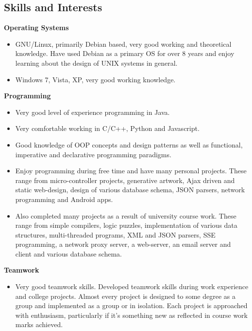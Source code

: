 \documentclass{res}
\begin{document}
\begin{resume}
 


     
\section{Skills and Interests} 
\renewcommand{\labelitemi}{$\bullet$}
\vspace{0.1in}
 {\bf Operating Systems}
    \begin{itemize} %
      \item GNU/Linux, primarily Debian based, very good working and theoretical knowledge. Have used Debian as a primary OS for over 8 years and enjoy learning about the design of UNIX systems in general.
      \item Windows 7, Vista, XP, very good working knowledge.
      \end{itemize}
{\bf Programming} 
       \begin{itemize}
        \item Very good level of experience programming in Java. 
        \item Very comfortable working in C/C++, Python and Javascript. 
        \item Good knowledge of OOP concepts and design patterns as well as functional, imperative and declarative programming paradigms. 
        \item Enjoy programming during free time and have many personal projects. These range from micro-controller projects, generative artwork, Ajax driven and static web-design, design of various database schema, JSON parsers, network programming and Android apps.
        \item Also completed many projects as a result of university course work. These range from simple compilers, logic puzzles, implementation of various data structures, multi-threaded programs, XML and JSON parsers, SSE programming, a network proxy server, a web-server, an email server and client and various database schema.
    \end{itemize}

    {\bf  Teamwork} 
        \begin{itemize}
        \item  Very good teamwork skills. Developed teamwork skills during work experience and college projects. Almost every project is designed to some degree as a group and implemented as a group or in isolation. Each project is approached with enthusiasm, particularly if it's something new as reflected in course work marks achieved.
       \end{itemize} 


\end{resume}
\end{document}
